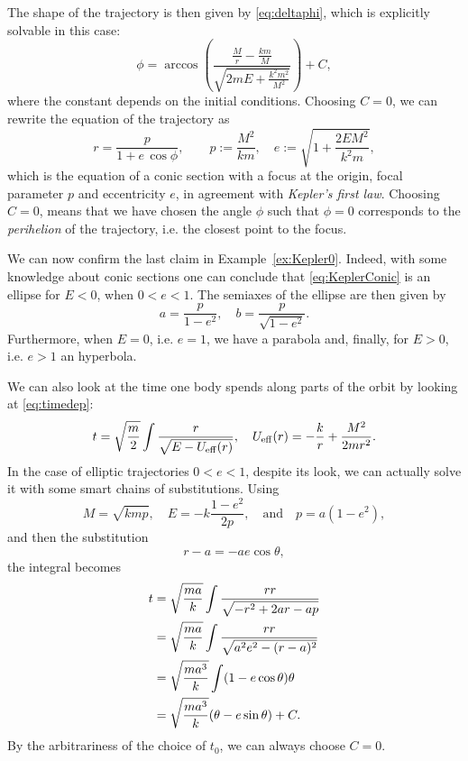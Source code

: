 \documentclass[english,fontsize=11pt,paper=a5,oneside]{scrbook}
\let\d\relax
\DeclareMathOperator{\d}{d}
\theoremstyle{definition}
\begin{document}
The shape of the trajectory is then given by \eqref{eq:deltaphi}, which is explicitly solvable in this case:
\begin{equation}
    \phi = \arccos\left(\frac{\frac{M}{r}-\frac{km}{M}}{\sqrt{2mE + \frac{k^2m^2}{M^2}}}\right) + C,
\end{equation}
where the constant depends on the initial conditions.
Choosing $C=0$, we can rewrite the equation of the trajectory as
\begin{equation}\label{eq:KeplerConic}
    r = \frac{p}{1+e\,\cos\phi}, \qquad p:=\frac{M^2}{km}, \quad e:=\sqrt{1+\frac{2EM^2}{k^2 m}},
\end{equation}
which is the equation of a conic section with a focus at the origin, focal parameter $p$ and eccentricity $e$, in agreement with \emph{Kepler's first law}.
Choosing $C=0$, means that we have chosen the angle $\phi$ such that $\phi=0$ corresponds to the \emph{perihelion} of the trajectory, i.e. the closest point to the focus.
\medskip

We can now confirm the last claim in Example~\ref{ex:Kepler0}.
Indeed, with some knowledge about conic sections one can conclude that \eqref{eq:KeplerConic} is an ellipse for $E<0$, when $0<e<1$. The semiaxes of the ellipse are then given by
\begin{equation}
    a = \frac{p}{1-e^2}, \quad b = \frac{p}{\sqrt{1-e^2}}.
\end{equation}
Furthermore, when $E=0$, i.e. $e = 1$, we have a parabola and, finally, for $E>0$, i.e. $e >1$ an hyperbola.

We can also look at the time one body spends along parts of the orbit by looking at \eqref{eq:timedep}:
\begin{equation}
    t = \sqrt{\frac{m}{2}}
        \int \frac{\d r}{\sqrt{E - U_{\mathrm{eff}}(r)}}, \quad U_{\mathrm{eff}}(r) = -\frac kr + \frac {M^2}{2 m r^2}.
\end{equation}
In the case of elliptic trajectories $0<e<1$, despite its look, we can actually solve it with some smart chains of substitutions. Using
\begin{equation}
    M = \sqrt{kmp}, \quad E = -k \frac{1-e^2}{2p}, \quad\mbox{and}\quad p= a(1-e^2),
\end{equation}
and then the substitution
\begin{equation}\label{eq:rkp}
    r - a = - a e \cos \theta,    
\end{equation}
the integral becomes
\begin{align}
    t &= \sqrt{\frac {ma}k} \int \frac{r\d r}{\sqrt{-r^2 + 2ar -ap}} \\
      &= \sqrt{\frac {ma}k} \int \frac{r\d r}{\sqrt{a^2e^2 - (r-a)^2}} \\
      &= \sqrt{\frac{ma^3}{k}} \int (1- e \cos\theta) \d \theta \\
      &= \sqrt{\frac{ma^3}{k}} (\theta- e \sin\theta) + C. \label{eq:tkp}
\end{align}
By the arbitrariness of the choice of $t_0$, we can always choose $C=0$.
\end{document}
